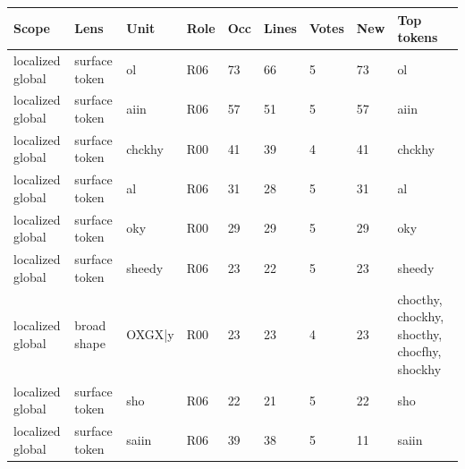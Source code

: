 \begin{tabular}{lllllllll}
\toprule
Scope & Lens & Unit & Role & Occ & Lines & Votes & New & Top tokens \\
\midrule
localized global & surface token & ol & R06 & 73 & 66 & 5 & 73 & ol \\
localized global & surface token & aiin & R06 & 57 & 51 & 5 & 57 & aiin \\
localized global & surface token & chckhy & R00 & 41 & 39 & 4 & 41 & chckhy \\
localized global & surface token & al & R06 & 31 & 28 & 5 & 31 & al \\
localized global & surface token & oky & R00 & 29 & 29 & 5 & 29 & oky \\
localized global & surface token & sheedy & R06 & 23 & 22 & 5 & 23 & sheedy \\
localized global & broad shape & OXGX|y & R00 & 23 & 23 & 4 & 23 & chocthy, chockhy, shocthy, chocfhy, shockhy \\
localized global & surface token & sho & R06 & 22 & 21 & 5 & 22 & sho \\
localized global & surface token & saiin & R06 & 39 & 38 & 5 & 11 & saiin \\
\bottomrule
\end{tabular}